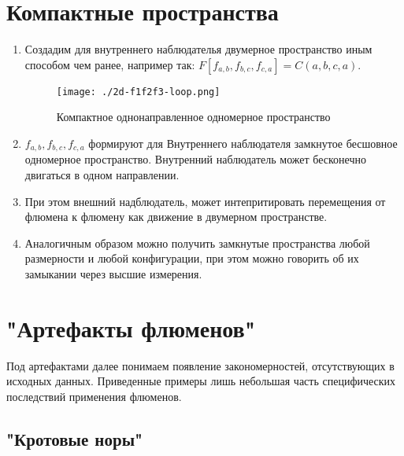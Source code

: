 \documentclass[final]{article}
\begin{document}
    \section{Компактные пространства}
        \begin{enumerate}

            \item Создадим для внутреннего наблюдателья двумерное пространство иным 
            способом чем ранее, например так: \( F[f_{a,b},f_{b,c},f_{c,a}] = C(a,b,c,a) \).

            \begin{figure}[H]
                \centering
                \texttt{[image: ./2d-f1f2f3-loop.png]}
                \caption{Компактное однонаправленное одномерное пространство}
                \label{fig:image}
            \end{figure}

            \item \(f_{a,b},f_{b,c},f_{c,a}\) формируют для Внутреннего наблюдателя 
            замкнутое бесшовное одномерное пространство. Внутренний наблюдатель может 
            бесконечно двигаться в одном направлении.

            \item При этом внешний надблюдатель, может интепритировать перемещения 
            от флюмена к флюмену как движение в двумерном пространстве.

            \item Аналогичным образом можно получить замкнутые пространства любой 
            размерности и любой конфигурации, при этом можно говорить об их замыкании 
            через высшие измерения.

        \end{enumerate}



    \section{"Артефакты флюменов"}
        
        Под артефактами далее понимаем появление закономерностей, отсутствующих 
        в исходных данных. Приведенные примеры лишь небольшая часть 
        специфических последствий применения флюменов.


        \subsection{"Кротовые норы"}
\end{document}
